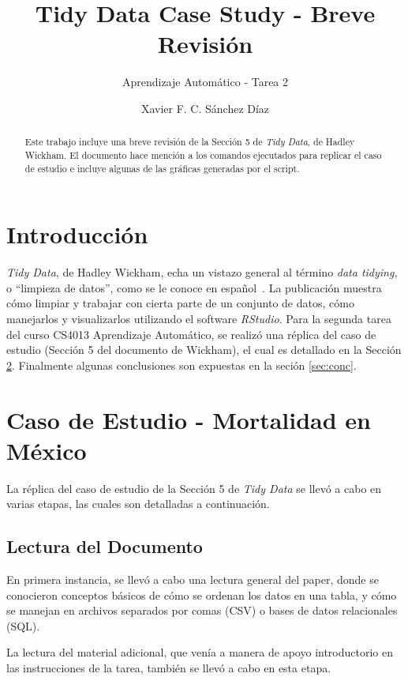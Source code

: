 \documentclass{llncs}
\title{Tidy Data Case Study - Breve Revisión}
\subtitle{Aprendizaje Automático - Tarea 2}
\author{Xavier F. C. Sánchez Díaz\inst{1}}
\institute{Tecnológico de Monterrey \\
\email{<mail@itesm.mx>}}
\begin{document}
\maketitle
\begin{abstract}
Este trabajo incluye una breve revisión de la Sección 5 de \textit{Tidy Data}, de Hadley Wickham.
El documento hace mención a los comandos ejecutados para replicar el caso de estudio e incluye algunas de las gráficas generadas por el script.
\end{abstract}

\section{Introducción}
\label{sec:intro}

\textit{Tidy Data}, de Hadley Wickham, echa un vistazo general al término \textit{data tidying}, o ``limpieza de datos'', como se le conoce en español~\cite{JSSv059i10}.
La publicación muestra cómo limpiar y trabajar con cierta parte de un conjunto de datos, cómo manejarlos y visualizarlos utilizando el software \textit{RStudio}.
Para la segunda tarea del curso CS4013 Aprendizaje Automático, se realizó una réplica del caso de estudio (Sección 5 del documento de Wickham), el cual es detallado en la Sección \ref{sec:case}.
Finalmente algunas conclusiones son expuestas en la seción \ref{sec:conc}.

\section{Caso de Estudio - Mortalidad en México}
\label{sec:case}

La réplica del caso de estudio de la Sección 5 de \textit{Tidy Data} se llevó a cabo en varias etapas, las cuales son detalladas a continuación.

\subsection{Lectura del Documento}
\label{subsec:read}

En primera instancia, se llevó a cabo una lectura general del paper,
donde se conocieron conceptos básicos de cómo se ordenan los datos en una tabla,
y cómo se manejan en archivos separados por comas (CSV) o bases de datos relacionales (SQL).

La lectura del material adicional, que venía a manera de apoyo introductorio en las instrucciones de la tarea, también se llevó a cabo en esta etapa.
\end{document}
